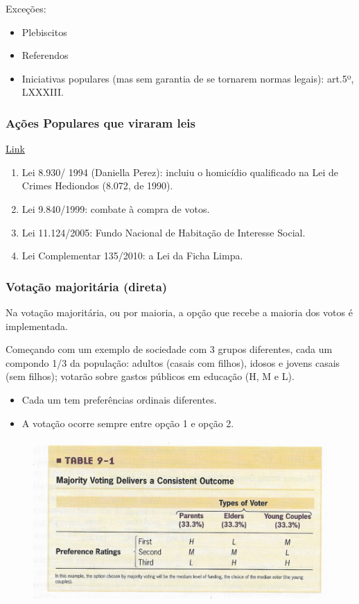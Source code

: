 \documentclass[a4paper,12pt]{article}[abntex2]
\begin{document}
Exceções:\begin{itemize}
    \item Plebiscitos
    \item Referendos
    \item Iniciativas populares (mas sem garantia de se tornarem normas legais): art.5º, LXXXIII.
\end{itemize}

\subsubsection{\textbf{Ações Populares que viraram leis}}
\href{https://oglobo.globo.com/brasil/comissao-aprova-nova-tramitacao-para-projetos-de-iniciativa-popular-21285077}{Link}\begin{enumerate}
    \item Lei 8.930/ 1994 (Daniella Perez): incluiu o homicídio qualificado na Lei de Crimes Hediondos (8.072, de 1990).
    \item Lei 9.840/1999: combate à compra de votos.
    \item Lei 11.124/2005: Fundo Nacional de Habitação de Interesse Social.
    \item Lei Complementar 135/2010: a Lei da Ficha Limpa.
\end{enumerate}

\subsubsection{\textbf{Votação majoritária (direta)}}
Na votação majoritária, ou por maioria, a opção que recebe a maioria dos votos é implementada.

Começando com um exemplo de sociedade com 3 grupos diferentes, cada um compondo 1/3 da população: adultos (casais com filhos), idosos e jovens casais (sem filhos); votarão sobre gastos públicos em educação (H, M e L).\begin{itemize} 
    \item Cada um tem preferências ordinais diferentes.
    \item A votação ocorre sempre entre opção 1 e opção 2.
\end{itemize}

\begin{figure}[H]
    \centering
    \includegraphics[width=0.7\linewidth]{Imagens/a14i2.png}
\end{figure}
\end{document}
